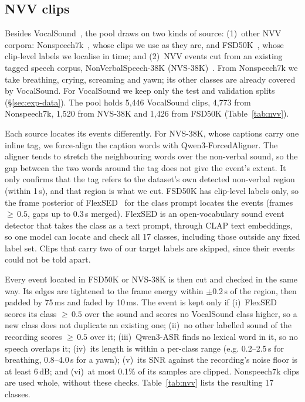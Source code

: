 \documentclass{article} %
\begin{document}
\subsection{NVV clips}
Besides VocalSound~\citep{vocalsound}, the pool draws on two kinds of source: (1)~other NVV
corpora: Nonspeech7k~\citep{nonspeech7k}, whose clips we use as they are, and
FSD50K~\citep{fsd50k}, whose clip-level labels we localise in time; and (2)~NVV events cut from
an existing tagged speech corpus, NonVerbalSpeech-38K (NVS-38K)~\citep{nvs38k}. From Nonspeech7k
we take breathing, crying, screaming and yawn; its other classes are already covered by
VocalSound. For VocalSound we keep only the test and validation splits (\S\ref{sec:exp-data}).
The pool holds 5,446 VocalSound clips, 4,773 from Nonspeech7k, 1,520 from NVS-38K and 1,426
from FSD50K (Table~\ref{tab:nvv}).

Each source locates its events differently. For NVS-38K, whose captions carry one inline
tag, we force-align the caption words with Qwen3-ForcedAligner. The aligner tends to stretch
the neighbouring words over the non-verbal sound, so the gap between the two words around the
tag does not give the event's extent. It only confirms that the tag refers to the dataset's
own detected non-verbal region (within 1\,s), and that region is what we cut. FSD50K has
clip-level labels only, so the frame posterior of FlexSED~\citep{flexsed} for the class prompt
locates the events (frames ${\ge}\,0.5$, gaps up to 0.3\,s merged). FlexSED is an
open-vocabulary sound event detector that takes the class as a text prompt, through CLAP text
embeddings, so one model can locate and check all 17 classes, including those outside any fixed
label set. Clips that carry two of our target labels are skipped, since their events could not
be told apart.

Every event located in FSD50K or NVS-38K is then cut and checked in the same way. Its edges are
tightened to the frame energy within $\pm$0.2\,s of the region, then padded by 75\,ms and faded
by 10\,ms. The event is kept only if (i)~FlexSED scores its class ${\ge}\,0.5$ over the sound
and scores no VocalSound class higher, so a new class does not duplicate an existing one;
(ii)~no other labelled sound of the recording scores ${\ge}\,0.5$ over it; (iii)~Qwen3-ASR finds
no lexical word in it, so no speech overlaps it; (iv)~its length is within a per-class range
(e.g. 0.2--2.5\,s for breathing, 0.8--4.0\,s for a yawn); (v)~its SNR against the recording's
noise floor is at least 6\,dB; and (vi)~at most 0.1\% of its samples are clipped. Nonspeech7k
clips are used whole, without these checks. Table~\ref{tab:nvv} lists the resulting 17 classes.
\end{document}
